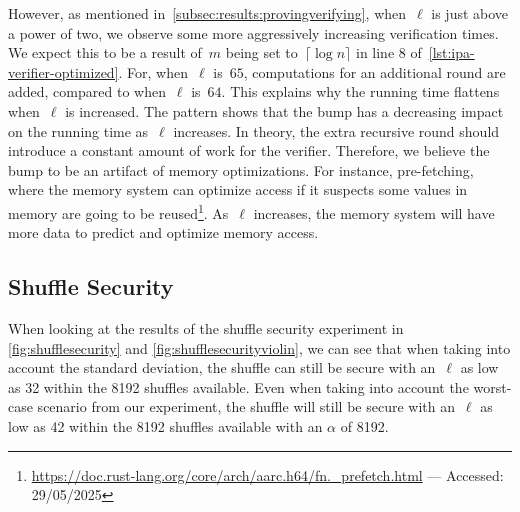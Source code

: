 However, as mentioned in~\autoref{subsec:results:provingverifying}, when~$\ell$ is just above a power of two, we observe some more aggressively increasing verification times.
We expect this to be a result of~$m$ being set to~$\lceil\log n\rceil$ in line 8 of~\autoref{lst:ipa-verifier-optimized}.
For, when~$\ell$ is~$65$, computations for an additional round are added, compared to when~$\ell$ is~$64$.
This explains why the running time flattens when~$\ell$ is increased.
The pattern shows that the bump has a decreasing impact on the running time as~$\ell$ increases.
In theory, the extra recursive round should introduce a constant amount of work for the verifier.
Therefore, we believe the bump to be an artifact of memory optimizations.
For instance, pre-fetching, where the memory system can optimize access if it suspects some values in memory are going to be reused\footnote{\href{https://doc.rust-lang.org/core/arch/aarch64/fn._prefetch.html}{https://doc.rust-lang.org/core/arch/aarc.h64/fn.\_prefetch.html} — Accessed: 29/05/2025}.
As~$\ell$ increases, the memory system will have more data to predict and optimize memory access.

\subsection{Shuffle Security}\label{subsec:Discution-Shuffle-security}
When looking at the results of the shuffle security experiment in \autoref{fig:shufflesecurity} and \autoref{fig:shufflesecurityviolin}, we can see that when taking into account the standard deviation, the shuffle can still be secure with an~$\ell$ as low as 32 within the 8192 shuffles available.
Even when taking into account the worst-case scenario from our experiment, the shuffle will still be secure with an~$\ell$ as low as 42 within the 8192 shuffles available with an $\alpha$ of 8192.

